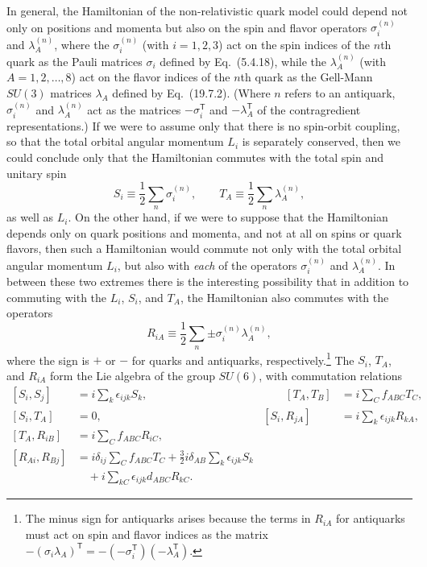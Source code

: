 In general, the Hamiltonian of the non-relativistic quark model could depend not
only on positions and momenta but also on the spin and flavor operators
$\sigma_i^{(n)}$ and $\lambda_A^{(n)}$, where the $\sigma_i^{(n)}$ (with
$i=1,2,3$) act on the spin indices of the $n$th quark as the Pauli matrices
$\sigma_i$ defined by Eq.~(5.4.18), while the $\lambda_A^{(n)}$ (with
$A=1,2,\ldots,8$) act on the flavor indices of the $n$th quark as the
Gell-Mann $SU(3)$ matrices $\lambda_A$ defined by Eq.~(19.7.2). (Where $n$
refers to an antiquark, $\sigma_i^{(n)}$ and $\lambda_A^{(n)}$ act as the
matrices $-\sigma_i^{\mathsf T}$ and $-\lambda_A^{\mathsf T}$ of the contragredient
representations.) If we were to assume only that there is no spin-orbit
coupling, so that the total orbital angular momentum $L_i$ is separately
conserved, then we could conclude only that the Hamiltonian commutes with the
total spin and unitary spin
\begin{equation}
 S_i\equiv\frac{1}{2}\sum_n\sigma_i^{(n)},
 \qquad
 T_A\equiv\frac{1}{2}\sum_n\lambda_A^{(n)},
 \tag{24.A.1}\label{eq:24.A.1}
\end{equation}
as well as $L_i$. On the other hand, if we were to suppose that the Hamiltonian
depends only on quark positions and momenta, and not at all on spins or quark
flavors, then such a Hamiltonian would commute not only with the total orbital
angular momentum $L_i$, but also with \emph{each} of the operators
$\sigma_i^{(n)}$ and $\lambda_A^{(n)}$. In between these two extremes there is
the interesting possibility that in addition to commuting with the $L_i$,
$S_i$, and $T_A$, the Hamiltonian also commutes with the operators
\begin{equation}
 R_{iA}\equiv\frac{1}{2}\sum_n\mathord{\pm}
 \sigma_i^{(n)}\lambda_A^{(n)},
 \tag{24.A.2}\label{eq:24.A.2}
\end{equation}
where the sign is $+$ or $-$ for quarks and antiquarks,
respectively.\footnote{The minus sign for antiquarks arises because the terms
in $R_{iA}$ for antiquarks must act on spin and flavor indices as the matrix
$-(\sigma_i\lambda_A)^{\mathsf T}=-(-\sigma_i^{\mathsf T})(-\lambda_A^{\mathsf T})$.} The $S_i$, $T_A$, and
$R_{iA}$ form the Lie algebra of the group $SU(6)$, with commutation relations
\begin{equation}
\begin{aligned}
 [S_i,S_j]&=i\sum_k\epsilon_{ijk}S_k,
 &\qquad [T_A,T_B]&=i\sum_C f_{ABC}T_C,
 \\[2pt]
 [S_i,T_A]&=0,
 & [S_i,R_{jA}]&=i\sum_k\epsilon_{ijk}R_{kA},
 \\[2pt]
 [T_A,R_{iB}]&=i\sum_C f_{ABC}R_{iC},
 \\[2pt]
 [R_{Ai},R_{Bj}]&=i\delta_{ij}\sum_C f_{ABC}T_C
 +\frac{3}{2}i\delta_{AB}\sum_k\epsilon_{ijk}S_k
 \\[-1pt]
 &\quad+i\sum_{kC}\epsilon_{ijk}d_{ABC}R_{kC}.
\end{aligned}
\tag{24.A.3}\label{eq:24.A.3}
\end{equation}

